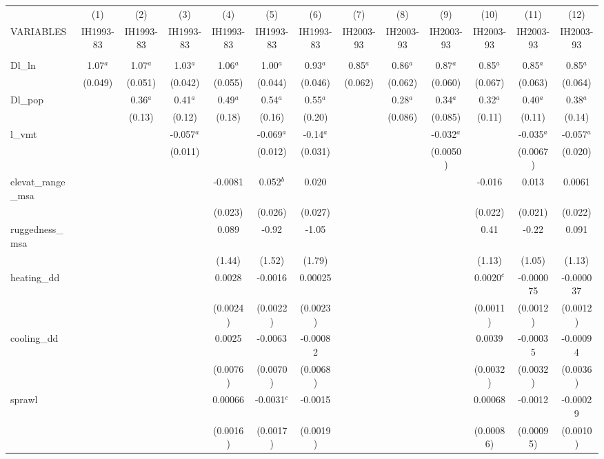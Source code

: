 \documentclass[]{article}
\begin{document}
\begin{tabular}{lcccccccccccc} \hline
 & (1) & (2) & (3) & (4) & (5) & (6) & (7) & (8) & (9) & (10) & (11) & (12) \\
VARIABLES & IH1993-83 & IH1993-83 & IH1993-83 & IH1993-83 & IH1993-83 & IH1993-83 & IH2003-93 & IH2003-93 & IH2003-93 & IH2003-93 & IH2003-93 & IH2003-93 \\ \hline
 &  &  &  &  &  &  &  &  &  &  &  &  \\
Dl\_ln & 1.07$^a$ & 1.07$^a$ & 1.03$^a$ & 1.06$^a$ & 1.00$^a$ & 0.93$^a$ & 0.85$^a$ & 0.86$^a$ & 0.87$^a$ & 0.85$^a$ & 0.85$^a$ & 0.85$^a$ \\
 & (0.049) & (0.051) & (0.042) & (0.055) & (0.044) & (0.046) & (0.062) & (0.062) & (0.060) & (0.067) & (0.063) & (0.064) \\
Dl\_pop &  & 0.36$^a$ & 0.41$^a$ & 0.49$^a$ & 0.54$^a$ & 0.55$^a$ &  & 0.28$^a$ & 0.34$^a$ & 0.32$^a$ & 0.40$^a$ & 0.38$^a$ \\
 &  & (0.13) & (0.12) & (0.18) & (0.16) & (0.20) &  & (0.086) & (0.085) & (0.11) & (0.11) & (0.14) \\
l\_vmt &  &  & -0.057$^a$ &  & -0.069$^a$ & -0.14$^a$ &  &  & -0.032$^a$ &  & -0.035$^a$ & -0.057$^a$ \\
 &  &  & (0.011) &  & (0.012) & (0.031) &  &  & (0.0050) &  & (0.0067) & (0.020) \\
elevat\_range\_msa &  &  &  & -0.0081 & 0.052$^b$ & 0.020 &  &  &  & -0.016 & 0.013 & 0.0061 \\
 &  &  &  & (0.023) & (0.026) & (0.027) &  &  &  & (0.022) & (0.021) & (0.022) \\
ruggedness\_msa &  &  &  & 0.089 & -0.92 & -1.05 &  &  &  & 0.41 & -0.22 & 0.091 \\
 &  &  &  & (1.44) & (1.52) & (1.79) &  &  &  & (1.13) & (1.05) & (1.13) \\
heating\_dd &  &  &  & 0.0028 & -0.0016 & 0.00025 &  &  &  & 0.0020$^c$ & -0.000075 & -0.000037 \\
 &  &  &  & (0.0024) & (0.0022) & (0.0023) &  &  &  & (0.0011) & (0.0012) & (0.0012) \\
cooling\_dd &  &  &  & 0.0025 & -0.0063 & -0.00082 &  &  &  & 0.0039 & -0.00035 & -0.00094 \\
 &  &  &  & (0.0076) & (0.0070) & (0.0068) &  &  &  & (0.0032) & (0.0032) & (0.0036) \\
sprawl &  &  &  & 0.00066 & -0.0031$^c$ & -0.0015 &  &  &  & 0.00068 & -0.0012 & -0.00029 \\
 &  &  &  & (0.0016) & (0.0017) & (0.0019) &  &  &  & (0.00086) & (0.00095) & (0.0010) \\

\end{tabular}
\end{document}
